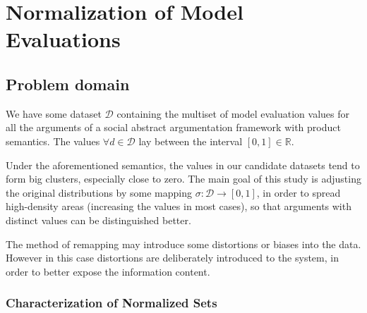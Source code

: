 \documentclass{article}
\newtheorem{property}{Property}
\newcommand{\valueset}{L}
\newcommand{\obj}{\mathcal{O}} %
\newcommand{\dataset}{\mathcal{D}}   %
\begin{document}
\begin{comment}
\begin{property}
\label{P1} [Absolute argument freeness] \\
Let $\tau$ be a a vote aggregation function given a set of values $\valueset$, a set of objects $\obj$ and a value function $V$. We say that $\tau$ is 'absolute argument free' if
\begin{center}
$\forall o \in \obj$, $\tau (o, \obj) \neq \top$.
\end{center}
\end{property}
\end{comment}


\section{Normalization of Model Evaluations}



\subsection{Problem domain}
We have some dataset $\dataset$ containing the multiset of model evaluation values for all the arguments of a social abstract argumentation framework with product semantics. The values $\forall d \in \dataset$ lay between the interval $[0,1] \in \mathbb{R}$.

Under the aforementioned semantics, the values in our candidate datasets tend to form big clusters, especially close to zero. The main goal of this study is adjusting the original distributions by some mapping $\sigma: \dataset  \rightarrow  [0,1]$, in order to spread high-density areas (increasing the values in most cases), so that arguments with distinct values can be distinguished better.

The method of remapping may introduce some distortions or biases into the data. However in this case distortions are deliberately introduced to the system, in order to better expose the information content. 

\subsubsection{Characterization of Normalized Sets}
\end{document}
